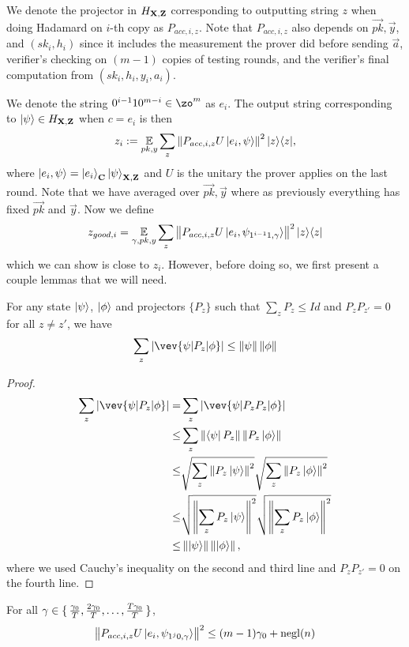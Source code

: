 We denote the projector in $H_{\mathbf{X},\mathbf{Z}}$ corresponding to outputting string $z$ when doing Hadamard on $i$-th copy as $P_{acc,i,z}$.
Note that $P_{acc,i,z}$ also depends on $\vec{pk}, \vec{y}$, and $(sk_i, h_i)$ since it includes the measurement the prover did before sending $\vec{a}$,  verifier's checking on $(m-1)$ copies of testing rounds, and  the verifier's final computation from $(sk_i,h_i,y_i,a_i)$.

We denote the string $0^{i-1}10^{m-i} \in \zo^m$ as $e_i$. The output string corresponding to $\ket{\psi} \in H_{\mathbf{X},\mathbf{Z}}$ when $c=e_i$ is then
$$z_i:= \operatorname*{\mathbb{E}}_{pk,y} \sum_z \left\lVert P_{acc,i,z} U\ket{e_i,\psi}\right\rVert^2|z\rangle\langle z|,$$
where $\ket{e_i,\psi}=\ket{e_i}_{\mathbf{C}}\ket{\psi}_{\mathbf{X},\mathbf{Z}}$ and $U$ is the unitary the prover applies on the last round.
Note that we have averaged over $\vec{pk}, \vec{y}$ where as previously everything has fixed $\vec{pk}$ and $\vec{y}$.
Now we define
\begin{align}
	z_{good, i}=\operatorname*{\mathbb{E}}_{\gamma, pk, y} \sum_z \left\lVert P_{acc,i,z} U\ket{e_i,\psi_{1^{i-1}1,\gamma}}\right\rVert^2|z\rangle\langle z|
\end{align}
which we can show is close to $z_i$.
However, before doing so, we first present a couple lemmas that we will need.
\begin{lemma}\label{lem:samp-tech}
	For any state $\ket{\psi}$,  $\ket{\phi}$ and projectors $\{P_z\}$ such that $\sum_z P_z \leq Id$ and $P_z P_{z'} =0 $ for all $z\neq z'$, we have
	$$  \sum_z |\vev{\psi|P_z|\phi}| \leq \norm{\psi}\norm{\phi} $$
\end{lemma}
\begin{proof}
	\begin{align}
		\sum_z |\vev{\psi|P_z|\phi}| =&\sum_z|\vev{\psi|P_zP_z|\phi}| \nn \\
		\leq& \sum_z \norm{\bra{\psi}P_z} \norm{ P_z\ket{\phi}} \nn \\
		\leq&  \sqrt{\sum_z \norm{P_z\ket{\psi}}^2} \sqrt{\sum_z\norm{P_z\ket{\phi}}^2} \nn \\
		\leq& \sqrt{\norm{\sum_z P_z\ket{\psi}}^2 } \sqrt{\norm{\sum_z P_z\ket{\phi}}^2 } \nn \\
		\leq & \norm{\ket{\psi}}\norm{\ket{\phi}},
	\end{align}
	where we used Cauchy's inequality on the second and third line and $P_z P_{z'} =0 $ on the fourth line.
\end{proof}
\begin{lemma}
	\label{lem:partition-testing}
	For all $\gamma\in\set{\frac{\gamma_0}{T},\frac{2\gamma_0}{T},\dots,\frac{T\gamma_0}{T}}$,
	$$\left\lVert P_{acc,i,z} U \ket{e_i, \psi_{1^j0,\gamma}}\right\rVert^2
		\leq (m-1)\gamma_0+\operatorname{negl}(n)$$
\end{lemma}
